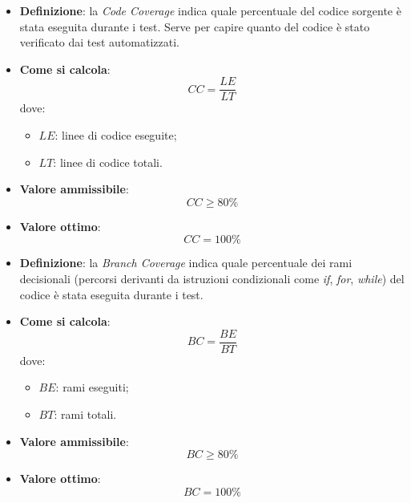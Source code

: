 \begin{itemize}
	\item \textbf{Definizione}: la \textit{Code Coverage} indica quale percentuale del codice sorgente è stata eseguita durante i test. Serve per capire quanto del codice è stato verificato dai test automatizzati.
	\item \textbf{Come si calcola}: \begin{equation*}CC = \frac{LE}{LT}\end{equation*} dove:
		\begin{itemize}
			\item $LE$: linee di codice eseguite;
			\item $LT$: linee di codice totali.
		\end{itemize}
	\item \textbf{Valore ammissibile}: \begin{equation*}CC \geq 80\%\end{equation*}
	\item \textbf{Valore ottimo}: \begin{equation*}CC = 100\%\end{equation*}
\end{itemize}

\begin{itemize}
	\item \textbf{Definizione}: la \textit{Branch Coverage} indica quale percentuale dei rami decisionali (percorsi derivanti da istruzioni condizionali come \textit{if}, \textit{for}, \textit{while}) del codice è stata eseguita durante i test.
	\item \textbf{Come si calcola}: \begin{equation*}BC = \frac{BE}{BT}\end{equation*} dove:
		\begin{itemize}
			\item $BE$: rami eseguiti;
			\item $BT$: rami totali.
		\end{itemize}
	\item \textbf{Valore ammissibile}: \begin{equation*}BC \geq 80\%\end{equation*}
	\item \textbf{Valore ottimo}: \begin{equation*}BC = 100\%\end{equation*}
\end{itemize}

